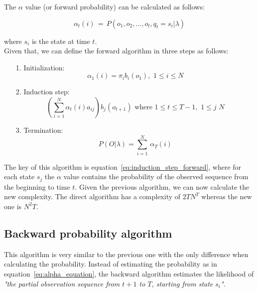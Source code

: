 \noindent The $\alpha$ value (or forward probability) can be calculated as follows:

\begin{equation}
\label{eq:alpha_equation}
	\alpha_{t}(i) \, = \, P(o_{1}, o_{2}, ... , o_{t}, q_{t} = s_{i} | \lambda)
\end{equation}

\noindent where $s_{i}$ is the state at time $t$. \\
Given that, we can define the forward algorithm in three steps as follows:

\begin{itemize}
	\item[1.]{Initialization:} \\
		\begin{equation}
			\alpha_{1}(i) = \pi_{i}b_{i}(o_{1}), \,\, 1 \leq i \leq N
		\end{equation}
	\item[2.]{Induction step:} \\
		\begin{equation}
		\label{eq:induction_step_forward}
			\left ( \sum_{i=1}^{N} \alpha_{t}(i) a_{ij} \right ) b_{j}(o_{t+1}) \,\, \text{where} \,\, 1 \leq t \leq T - 1, \,\, 1 \leq j \,\, N
		\end{equation}
	\item[3.]{Termination:} \\
		\begin{equation}
			P(O|\lambda) = \sum_{i=1}^{N} \, \alpha_{T}(i)
		\end{equation}
\end{itemize}

\noindent The key of this algorithm is equation~\ref{eq:induction_step_forward}, where for each state $s_{j}$ the $\alpha$ value contains the probability of the observed sequence from the beginning to time $t$. Given the previous algorithm, we can now calculate the new complexity. The direct algorithm has a complexity of $2TN^{T}$ whereas the new one is $N^{2}T$.

\subsection{Backward probability algorithm}
This algorithm is very similar to the previous one with the only difference when calculating the probability. Instead of estimating the probability as in equation~\ref{eq:alpha_equation}, the backward algorithm estimates the likelihood of \textit{"the partial observation sequence from $t+1$ to $T$, starting from state $s_{i}$"}\cite{hmm_tutorial}. \\

